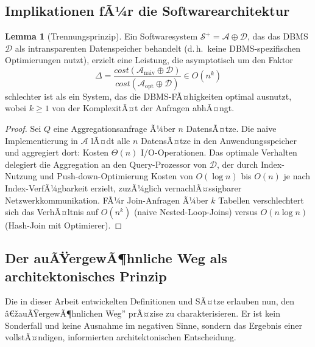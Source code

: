 ﻿\documentclass[a4paper,12pt]{article}
\theoremstyle{definition}
\newtheorem{lemma}{Lemma}
\begin{document}
\subsection{Implikationen fÃ¼r die Softwarearchitektur}

\begin{lemma}[Trennungsprinzip]
\label{lem:trennung}
Ein Softwaresystem $\mathcal{S}^+ = \mathcal{A} \oplus \mathcal{D}$, das das DBMS $\mathcal{D}$ als intransparenten Datenspeicher behandelt (d.\,h.\ keine DBMS-spezifischen Optimierungen nutzt), erzielt eine Leistung, die asymptotisch um den Faktor
\[
\Delta = \frac{\mathit{cost}(\mathcal{A}_{\text{naiv}} \oplus \mathcal{D})}{\mathit{cost}(\mathcal{A}_{\text{opt}} \oplus \mathcal{D})} \in O(n^k)
\]
schlechter ist als ein System, das die DBMS-FÃ¤higkeiten optimal ausnutzt, wobei $k \geq 1$ von der KomplexitÃ¤t der Anfragen abhÃ¤ngt.
\end{lemma}

\begin{proof}
Sei $Q$ eine Aggregationsanfrage Ã¼ber $n$ DatensÃ¤tze. Die naive Implementierung in $\mathcal{A}$ lÃ¤dt alle $n$ DatensÃ¤tze in den Anwendungsspeicher und aggregiert dort: Kosten $\Theta(n)$ I/O-Operationen. Das optimale Verhalten delegiert die Aggregation an den Query-Prozessor von $\mathcal{D}$, der durch Index-Nutzung und Push-down-Optimierung Kosten von $O(\log n)$ bis $O(n)$ je nach Index-VerfÃ¼gbarkeit erzielt, zuzÃ¼glich vernachlÃ¤ssigbarer Netzwerkkommunikation. FÃ¼r Join-Anfragen Ã¼ber $k$ Tabellen verschlechtert sich das VerhÃ¤ltnis auf $O(n^k)$ (naive Nested-Loop-Joins) versus $O(n \log n)$ (Hash-Join mit Optimierer).
\end{proof}

\subsection{Der auÃŸergewÃ¶hnliche Weg als architektonisches Prinzip}

Die in dieser Arbeit entwickelten Definitionen und SÃ¤tze erlauben nun, den â€žauÃŸergewÃ¶hnlichen Weg'' prÃ¤zise zu charakterisieren. Er ist kein Sonderfall und keine Ausnahme im negativen Sinne, sondern das Ergebnis einer vollstÃ¤ndigen, informierten architektonischen Entscheidung.
\end{document}
